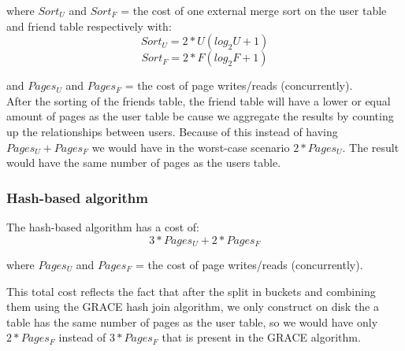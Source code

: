 \documentclass{article}      %
\begin{document}
where  \begin{math}Sort_U \end{math} and \begin{math}Sort_F \end{math} = the cost of one external merge sort on the user table and friend table respectively with:
\begin{equation}
Sort_U = 2*U(log_2U + 1)
\end{equation}
\begin{equation}
Sort_F = 2*F(log_2F + 1)
\end{equation}

and \begin{math}Pages_U \end{math} and \begin{math}Pages_F \end{math}  = the cost of page writes/reads (concurrently).\\

After the sorting of the friends table, the friend table will have a lower or equal amount of pages as the user table be cause we aggregate the results by counting up the relationships between users. Because of this instead of having \begin{math}Pages_U + Pages_F \end{math} we would have in the worst-case scenario \begin{math}2 * Pages_U\end{math}. The result would have the same number of pages as the users table.



\subsubsection* {Hash-based algorithm}

The hash-based algorithm has a cost of:
\begin{equation}
3 * Pages_U + 2 * Pages_F
\end{equation}

where \begin{math}Pages_U\end{math} and \begin{math}Pages_F\end{math}  = the cost of page writes/reads (concurrently).

This total cost reflects the fact that after the split in buckets and combining them using the GRACE hash join algorithm, we only construct on disk the a table has the same number of pages as the user table, so we would have only \begin{math}2 * Pages_F\end{math} instead of \begin{math}3 * Pages_F\end{math} that is present in the GRACE algorithm.
\end{document}
